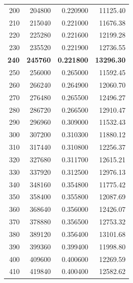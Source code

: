 \begin{table}[H]
\begin{tabular}{|r|r|r|r|}
        200          & 204800          & 0.220900          & 11125.40          \\
        210          & 215040          & 0.221000          & 11676.38          \\
        220          & 225280          & 0.221600          & 12199.28          \\
        230          & 235520          & 0.221900          & 12736.55          \\
        \textbf{240} & \textbf{245760} & \textbf{0.221800} & \textbf{13296.30} \\
        250          & 256000          & 0.265000          & 11592.45          \\
        260          & 266240          & 0.264900          & 12060.70          \\
        270          & 276480          & 0.265500          & 12496.27          \\
        280          & 286720          & 0.266500          & 12910.47          \\
        290          & 296960          & 0.309000          & 11532.43          \\
        300          & 307200          & 0.310300          & 11880.12          \\
        310          & 317440          & 0.310800          & 12256.37          \\
        320          & 327680          & 0.311700          & 12615.21          \\
        330          & 337920          & 0.312500          & 12976.13          \\
        340          & 348160          & 0.354800          & 11775.42          \\
        350          & 358400          & 0.355800          & 12087.69          \\
        360          & 368640          & 0.356000          & 12426.07          \\
        370          & 378880          & 0.356500          & 12753.32          \\
        380          & 389120          & 0.356400          & 13101.68          \\
        390          & 399360          & 0.399400          & 11998.80          \\
        400          & 409600          & 0.400600          & 12269.59          \\
        410          & 419840          & 0.400400          & 12582.62          \\

\end{tabular}
\end{table}
